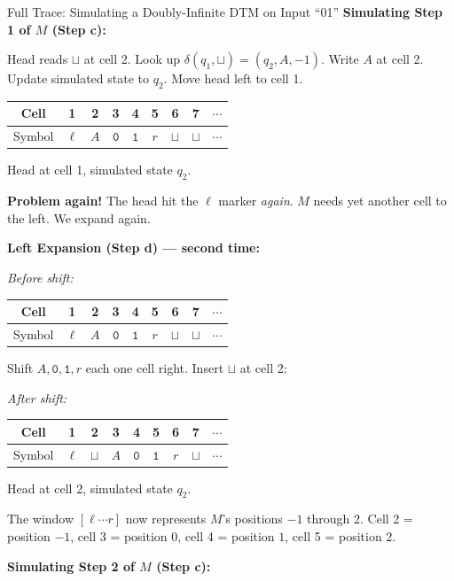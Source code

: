 \begin{examplebox}{{Full Trace: Simulating a Doubly-Infinite DTM on Input ``01''}}
\bigskip
\textbf{Simulating Step 1 of $M$ (Step c):}

Head reads $\sqcup$ at cell 2. Look up $\delta(q_1, \sqcup) = (q_2, A, -1)$.
Write $A$ at cell 2. Update simulated state to $q_2$. Move head left to cell 1.

\begin{center}
\begin{tabular}{c|cccccccc}
Cell & 1 & 2 & 3 & 4 & 5 & 6 & 7 & $\cdots$ \\
\hline
Symbol & $\ell$ & $A$ & $\mathtt{0}$ & $\mathtt{1}$ & $r$ & $\sqcup$ & $\sqcup$ & $\cdots$ \\
\end{tabular}
\quad Head at cell 1, simulated state $q_2$.
\end{center}

\textbf{Problem again!} The head hit the $\ell$ marker \emph{again}. $M$ needs
yet another cell to the left. We expand again.

\bigskip
\textbf{Left Expansion (Step d) --- second time:}

\textit{Before shift:}
\begin{center}
\begin{tabular}{c|cccccccc}
Cell & 1 & 2 & 3 & 4 & 5 & 6 & 7 & $\cdots$ \\
\hline
Symbol & $\ell$ & $A$ & $\mathtt{0}$ & $\mathtt{1}$ & $r$ & $\sqcup$ & $\sqcup$ & $\cdots$ \\
\end{tabular}
\end{center}

Shift $A, \mathtt{0}, \mathtt{1}, r$ each one cell right. Insert $\sqcup$ at
cell 2:

\textit{After shift:}
\begin{center}
\begin{tabular}{c|cccccccc}
Cell & 1 & 2 & 3 & 4 & 5 & 6 & 7 & $\cdots$ \\
\hline
Symbol & $\ell$ & $\sqcup$ & $A$ & $\mathtt{0}$ & $\mathtt{1}$ & $r$ & $\sqcup$ & $\cdots$ \\
\end{tabular}
\quad Head at cell 2, simulated state $q_2$.
\end{center}

The window $[\ell \cdots r]$ now represents $M$'s positions $-1$ through $2$.
Cell 2 = position $-1$, cell 3 = position $0$, cell 4 = position $1$,
cell 5 = position $2$.

\bigskip
\textbf{Simulating Step 2 of $M$ (Step c):}


\end{examplebox}

